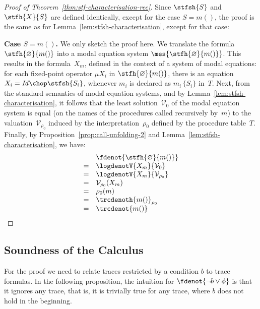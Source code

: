 \documentclass[a4paper,numberwithinsect]{lipics-v2021}
\newcommand{\dg}[1]{\marginpar{DG: #1}}
\begin{document}
\begin{proof}[Proof of Theorem~\ref{thm:stf-characterisation-rec}]
  Since $\stfsh{S}$ and $\stfh{X}{S}$ are defined identically, except
  for the case $S=m()$, the proof is the same as for
  Lemma~\ref{lem:stfsh-characterisation}, except for that case:
  
  \noindent\textbf{Case $S = m()$.} 
  We only sketch the proof here. 
  We translate the formula $\stfh{\varnothing}{m()}$ into a modal
  equation system $\mes{\stfh{\varnothing}{m()}}$.
  This results in the formula~$X_m$, defined in the context of a
  system of modal equations: for each fixed-point operator $\mu X_i$
  in $\stfh{\varnothing}{m()}$, there is an equation
  $X_i = \mathit{Id} \chop \stfsh{S_i}$, whenever $m_i$ is declared as
  $m_i\, \{S_i\}$ in~$T$.
  Next, from the standard semantics of modal equation systems,
  and by Lemma~\ref{lem:stfsh-characterisation}, it follows that the
  least solution~$\mathcal{V}_0$ of the modal equation system is equal
  (on the names of the procedures called recursively by~$m$) to the
  valuation~$\mathcal{V}_{\rho_0}$ induced by the
  interpretation~$\rho_0$ defined by the procedure table~$T$.
  Finally, by Proposition~\ref{prop:call-unfolding-2} and
  Lemma~\ref{lem:stfsh-characterisation}, we have:
  \[
    \begin{array}{cl}
      & \fdenot{\stfh{\varnothing}{m()}} \\
      = & \logdenotV{X_m}{\mathcal{V}_0} \\
      = & \logdenotV{X_m}{\mathcal{V}_{\rho_0}} \\
      = & \mathcal{V}_{\rho_0} (X_m) \\
      = & \rho_0 (m) \\
      = & \trcdenoth{m()}_{\rho_0}  \\
      = & \trcdenot{m()}
    \end{array}
  \]
\end{proof}

\subsection{Soundness of the Calculus}
\label{sec:soundness-app}

For the proof we need to relate traces restricted by a condition $b$
to trace formulas. In the following proposition, the intuition for
$\fdenot{\lnot b\lor\phi}$ is that it ignores any trace, that is, it
is trivially true for any trace, where $b$ does not hold in the
beginning.
\end{document}
